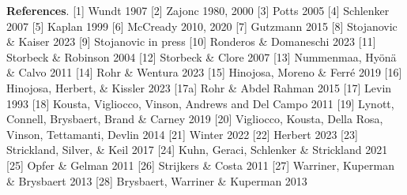 
\footnotesize
\noindent \textbf{References}.
[1] Wundt 1907
[2] Zajonc 1980, 2000
[3] Potts 2005 
[4] Schlenker 2007 
[5] Kaplan 1999 
[6] McCready 2010, 2020 
[7] Gutzmann 2015 
[8] Stojanovic \& Kaiser 2023 
[9] Stojanovic in press 
[10] Ronderos \& Domaneschi 2023 
[11] Storbeck \& Robinson 2004 
[12] Storbeck \& Clore 2007 
[13] Nummenmaa, Hyönä \& Calvo 2011 
[14] Rohr \& Wentura 2023 
[15] Hinojosa, Moreno \& Ferré 2019 
[16] Hinojosa, Herbert, \& Kissler 2023
[17a] Rohr \& Abdel Rahman 2015 
[17] Levin 1993
[18] Kousta, Vigliocco, Vinson, Andrews and Del Campo 2011 
[19] Lynott, Connell, Brysbaert, Brand \& Carney 2019 
[20] Vigliocco, Kousta, Della Rosa, Vinson, Tettamanti, Devlin 2014 
[21] Winter 2022 
[22] Herbert 2023 
[23] Strickland, Silver, \& Keil 2017
[24] Kuhn, Geraci, Schlenker \& Strickland 2021
[25] Opfer \& Gelman 2011
[26] Strijkers \& Costa 2011
[27] Warriner, Kuperman \& Brysbaert 2013
[28] Brysbaert, Warriner \& Kuperman 2013




